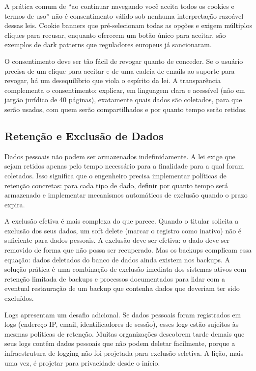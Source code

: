 A prática comum de ``ao continuar navegando você aceita todos os cookies e
termos de uso'' não é consentimento válido sob nenhuma interpretação razoável
dessas leis. Cookie banners que pré-selecionam todas as opções e exigem
múltiplos cliques para recusar, enquanto oferecem um botão único para aceitar,
são exemplos de dark patterns que reguladores europeus já sancionaram.

O consentimento deve ser tão fácil de revogar quanto de conceder. Se o usuário
precisa de um clique para aceitar e de uma cadeia de emails ao suporte para
revogar, há um desequilíbrio que viola o espírito da lei. A transparência
complementa o consentimento: explicar, em linguagem clara e acessível (não em
jargão jurídico de 40 páginas), exatamente quais dados são coletados, para que
serão usados, com quem serão compartilhados e por quanto tempo serão retidos.

\subsection{Retenção e Exclusão de Dados}

Dados pessoais não podem ser armazenados indefinidamente. A lei exige que sejam
retidos apenas pelo tempo necessário para a finalidade para a qual foram coletados.
Isso significa que o engenheiro precisa implementar políticas de retenção
concretas: para cada tipo de dado, definir por quanto tempo será armazenado e
implementar mecanismos automáticos de exclusão quando o prazo expira.

A exclusão efetiva é mais complexa do que parece. Quando o titular solicita a
exclusão dos seus dados, um soft delete (marcar o registro como inativo) não é
suficiente para dados pessoais. A exclusão deve ser efetiva: o dado deve ser
removido de forma que não possa ser recuperado. Mas os backups complicam essa
equação: dados deletados do banco de dados ainda existem nos backups. A solução
prática é uma combinação de exclusão imediata dos sistemas ativos com retenção
limitada de backups e processos documentados para lidar com a eventual
restauração de um backup que contenha dados que deveriam ter sido excluídos.

Logs apresentam um desafio adicional. Se dados pessoais foram registrados em
logs (endereço IP, email, identificadores de sessão), esses logs estão
sujeitos às mesmas políticas de retenção. Muitas organizações descobrem tarde
demais que seus logs contêm dados pessoais que não podem deletar facilmente,
porque a infraestrutura de logging não foi projetada para exclusão seletiva.
A lição, mais uma vez, é projetar para privacidade desde o início.

